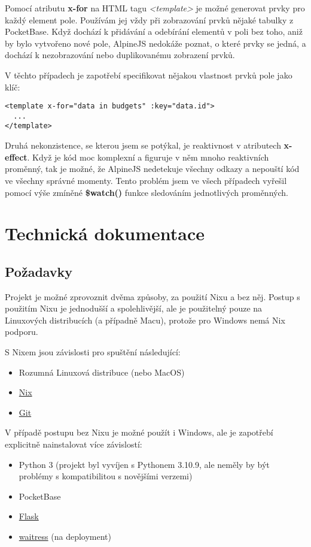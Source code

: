 \documentclass[11pt,a4paper,twoside,openright]{report}
\begin{document}
Pomocí atributu \textbf{x-for} na HTML tagu \emph{<template>} je možné generovat prvky pro každý element
pole. Používám jej vždy při zobrazování prvků nějaké tabulky z PocketBase. Když dochází k přidávání a odebírání
elementů v poli bez toho, aniž by bylo vytvořeno nové pole, AlpineJS nedokáže poznat, o které prvky se jedná,
a dochází k nezobrazování nebo duplikovanému zobrazení prvků.

V těchto případech je zapotřebí specifikovat nějakou vlastnost prvků pole jako klíč:

\begin{verbatim}
<template x-for="data in budgets" :key="data.id">
  ...
</template>
\end{verbatim}

Druhá nekonzistence, se kterou jsem se potýkal, je reaktivnost v atributech \textbf{x-effect}. Když je kód
moc komplexní a figuruje v něm mnoho reaktivních proměnný, tak je možné, že AlpineJS nedetekuje všechny
odkazy a nepouští kód ve všechny správné momenty. Tento problém jsem ve všech případech vyřešil pomocí
výše zmíněné \textbf{\$watch()} funkce sledováním jednotlivých proměnných.


\chapter{Technická dokumentace}

\section{Požadavky}
Projekt je možné zprovoznit dvěma způsoby, za použití Nixu a bez něj. Postup s použitím Nixu je jednodušší a spolehlivější,
ale je použitelný pouze na Linuxových distribucích (a případně Macu), protože pro Windows nemá Nix podporu.

S Nixem jsou závislosti pro spuštění následující:

\begin{itemize}
  \item Rozumná Linuxová distribuce (nebo MacOS)
  \item \href{https://nixos.org/}{Nix}
  \item \href{}{Git}
\end{itemize}

V případě postupu bez Nixu je možné použít i Windows, ale je zapotřebí explicitně nainstalovat více závislostí:

\begin{itemize}
\item Python 3 (projekt byl vyvíjen s Pythonem 3.10.9, ale neměly by být problémy s kompatibilitou s novějšími verzemi)
\item PocketBase
\item \href{https://flask.palletsprojects.com/en/2.2.x/}{Flask}
\item \href{https://pypi.org/project/waitress/}{waitress} (na deployment)
\end{itemize}
\end{document}
